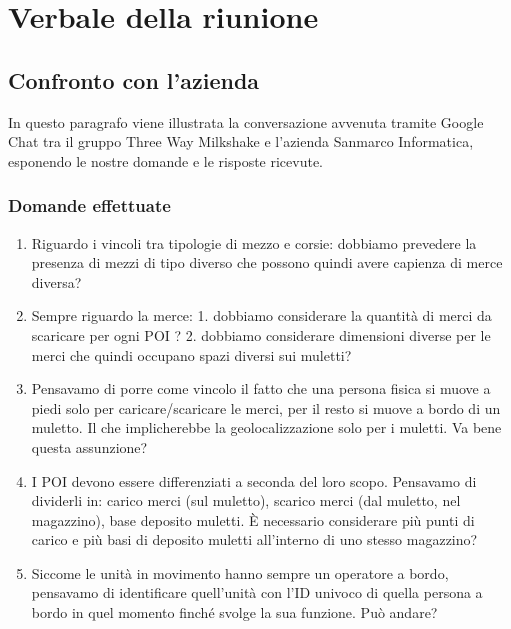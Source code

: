 \section{Verbale della riunione}

\subsection{Confronto con l'azienda}
In questo paragrafo viene illustrata la conversazione avvenuta tramite Google Chat tra il gruppo Three Way Milkshake e l'azienda Sanmarco Informatica, esponendo le nostre domande e le risposte ricevute.
\subsubsection{Domande effettuate}
\begin{enumerate}
	\item Riguardo i vincoli tra tipologie di mezzo e corsie: dobbiamo prevedere la presenza di mezzi di tipo diverso che possono quindi avere capienza di merce diversa? 
	
	\item Sempre riguardo la merce: 1. dobbiamo considerare la quantità di merci da scaricare per ogni POI ? 2. dobbiamo considerare dimensioni diverse per le merci che quindi occupano spazi diversi sui muletti? 
	
	\item Pensavamo di porre come vincolo il fatto che una persona fisica si muove a piedi solo per caricare/scaricare le merci, per il resto si muove a bordo di un muletto. Il che implicherebbe la geolocalizzazione solo per i muletti. Va bene questa assunzione? 
	
	\item I POI devono essere differenziati a seconda del loro scopo. Pensavamo di dividerli in: carico merci (sul muletto), scarico merci (dal muletto, nel magazzino), base deposito muletti. È necessario considerare più punti di carico e più basi di deposito muletti all'interno di uno stesso magazzino? 
	
	\item Siccome le unità in movimento hanno sempre un operatore a bordo, pensavamo di identificare quell'unità con l'ID univoco di quella persona a bordo in quel momento finché svolge la sua funzione. Può andare?
\end{enumerate}
